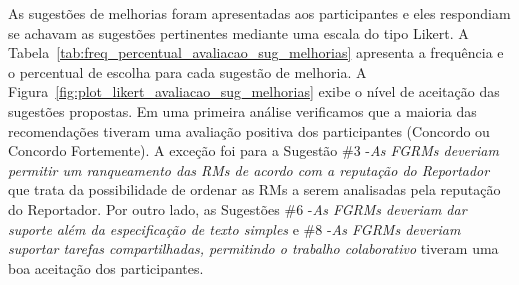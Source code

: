 As sugestões de melhorias foram apresentadas aos participantes e eles
respondiam se achavam as sugestões pertinentes mediante uma escala do tipo
Likert. A Tabela~\ref{tab:freq_percentual_avaliacao_sug_melhorias} apresenta a
frequência e o percentual de escolha para cada sugestão de melhoria. A
Figura~\ref{fig:plot_likert_avaliacao_sug_melhorias} exibe o nível de aceitação
das sugestões propostas. Em uma primeira análise verificamos que a maioria das
recomendações tiveram uma avaliação positiva dos participantes (Concordo ou
Concordo Fortemente). A exceção foi para a Sugestão \#3 \@-\@ \textit{As FGRMs
    deveriam permitir um ranqueamento das RMs de acordo com a reputação do
    Reportador} que trata da possibilidade de ordenar as RMs a serem analisadas
pela reputação do Reportador. Por outro lado, as Sugestões \#6 \@-\@ \textit{As
    FGRMs deveriam dar suporte além da especificação de texto simples}  e \#8
\@-\@ \textit{As FGRMs deveriam suportar tarefas compartilhadas, permitindo o
    trabalho colaborativo} tiveram uma boa aceitação dos participantes.

\begin{table}[htpb]
\centering
{}
\caption{Frequência e percentual das respostas sobre a relevância das sugestões de melhorias}
\label{tab:freq_percentual_avaliacao_sug_melhorias}
\end{table}

